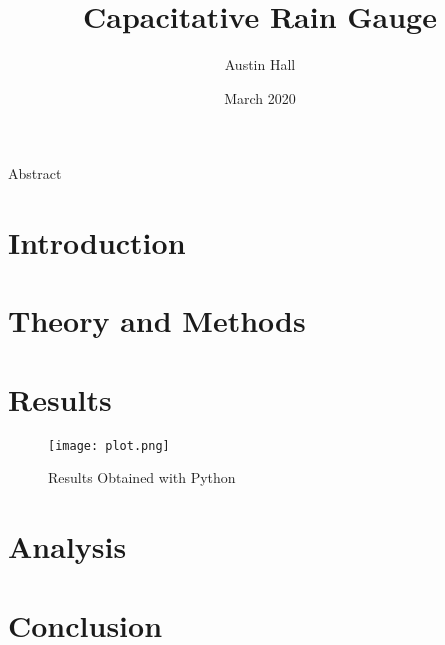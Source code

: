 \documentclass{article}
\author{Austin Hall}
\date{March 2020}
\title{\huge Capacitative Rain Gauge}
\begin{document}
\maketitle
\begin{center}
{\LARGE Abstract}\\
\end{center}

\newpage
\section{Introduction}


\newpage
\section{Theory and Methods}


\newpage
\section{Results}
\begin{figure}[h!]
\centering
\texttt{[image: plot.png]}
\caption{Results Obtained with Python}
\label{fig:SunData}
\end{figure}

\newpage
\section{Analysis}


\newpage
\section{Conclusion}
\newpage

\end{document}
